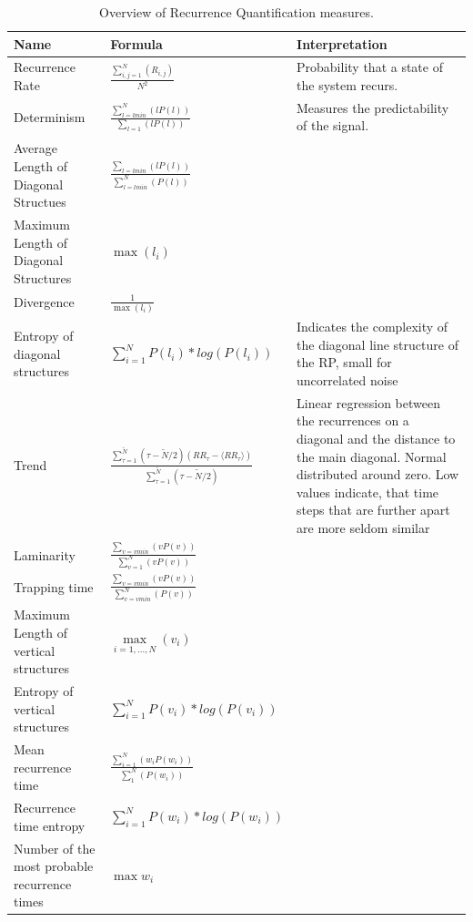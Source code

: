 \documentclass{article}
\begin{document}
\begin{landscape}
\renewcommand{\arraystretch}{2}
\begin{table}[]
\centering
\begin{tabular}{p{3cm}p{4cm}p{14cm}}
\toprule
 Name & Formula & Interpretation \\
 \midrule
 Recurrence Rate & $\frac{\sum\limits_{i,j=1}^N(R_{i,j})}{N^2} $ & Probability that a state of the system recurs.  \\
 Determinism & $\frac{\sum\limits_{l=lmin}^N(l P(l))}{\sum_{l=1}(l P(l))} $ & Measures the predictability of the signal.   \\
 Average Length \newline of Diagonal Structues & $\frac{\sum_{l=lmin}(l P(l))}{\sum_{l=lmin}^{N}(P(l))}$  &  \\
 Maximum Length \newline of Diagonal Structures & $\max(l_i)$ &  \\
 Divergence & $\frac{1}{\max(l_i)}$ &  \\
 Entropy of diagonal structures & $\sum\limits_{i=1}^N P(l_i) * log(P(l_i))$ & Indicates the complexity of the diagonal line structure of the RP, small for uncorrelated noise  \\
 Trend & $ \frac{\sum_{\tau=1}^{\tilde{N}}(\tau - \tilde{N}/2)(RR_\tau - \langle RR_\tau \rangle)}{\sum_{\tau=1}^{\tilde{N}}(\tau - \tilde{N}/2)}$ &
  Linear regression between the recurrences on a diagonal and the distance to the main diagonal. Normal distributed around zero.
   Low values indicate, that time steps that are further apart are more seldom similar \\
 Laminarity & $\frac{\sum_{v=vmin}(v P(v))}{\sum_{v=1}^{N}(v P(v))}$ &  \\
 Trapping time & $\frac{\sum_{v=vmin}(v P(v))}{\sum_{v=vmin}^{N}(P(v))}$ &  \\
 Maximum Length of vertical structures & $\max\limits_{i=1, ..., N}(v_i)$ &  \\
 Entropy of vertical structures& $\sum\limits_{i=1}^N P(v_i) * log(P(v_i))$ &  \\
 Mean recurrence time & $\frac{\sum\limits_{i=1}^N(w_i P(w_i))}{\sum_{1}^{N}(P(w_i))}$  &  \\
 Recurrence time entropy & $\sum\limits_{i=1}^N P(w_i) * log(P(w_i))$  & \\
 Number of the most probable recurrence times & $\max w_i$ & \\ \bottomrule
\end{tabular}
\caption{Overview of Recurrence Quantification measures.}
\label{RQA_table}
\end{table}
\end{landscape}
\end{document}
